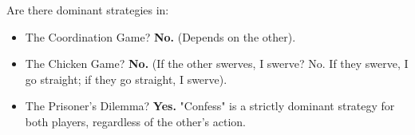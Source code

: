 \begin{exemple}
Are there dominant strategies in:
\begin{itemize}
    \item The Coordination Game? \textbf{No.} (Depends on the other).
    \item The Chicken Game? \textbf{No.} (If the other swerves, I swerve? No. If they swerve, I go straight; if they go straight, I swerve).
    \item The Prisoner's Dilemma? \textbf{Yes.} "Confess" is a strictly dominant strategy for both players, regardless of the other's action.
\end{itemize}
\end{exemple}
